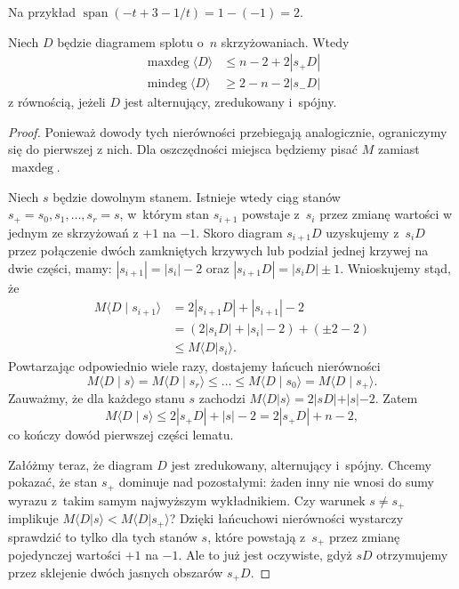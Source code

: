 Na przykład $\operatorname{span} (-t+3-1/t) = 1 - (-1) = 2$.

 \begin{lemma}
    \label{lem:pretait_lemma_2}
    Niech $D$ będzie diagramem splotu o~$n$ skrzyżowaniach.
    Wtedy
    \begin{align}
        \operatorname{maxdeg} \langle D \rangle & \le n - 2 + 2|s_+D| \\
        \operatorname{mindeg} \langle D \rangle & \ge 2 - n - 2|s_-D|
    \end{align}
    z równością, jeżeli $D$ jest alternujący, zredukowany i~spójny.
\end{lemma}

\begin{proof}
    Ponieważ dowody tych nierówności przebiegają analogicznie, ograniczymy się do pierwszej z nich.
    Dla oszczędności miejsca będziemy pisać $M$ zamiast $\operatorname{maxdeg}$.

    Niech $s$ będzie dowolnym stanem.
    Istnieje wtedy ciąg stanów $s_+ = s_0, s_1, \ldots, s_r = s$, w~którym stan $s_{i+1}$ powstaje z~$s_i$ przez zmianę wartości w jednym ze skrzyżowań z $+1$ na $-1$.
    Skoro diagram $s_{i+1}D$ uzyskujemy z~$s_{i}D$ przez połączenie dwóch zamkniętych krzywych lub podział jednej krzywej na dwie części, mamy: $|s_{i+1}| = |s_i| - 2$ oraz $|s_{i+1}D| = |s_iD| \pm 1$.
    Wnioskujemy stąd, że
    \begin{align}
        M \langle D \mid s_{i+1} \rangle
        & = 2|s_{i+1}D| + |s_{i+1}|-2 \\
        & = (2|s_iD| + |s_i| -2 ) + (\pm 2-2) \\
        & \le M \langle D|s_i\rangle.
    \end{align}
    Powtarzając odpowiednio wiele razy, dostajemy łańcuch nierówności
    \begin{equation}
        M \langle D \mid s \rangle
        =
        M \langle D \mid s_r \rangle
        \le \ldots \le
        M \langle D \mid s_0 \rangle
        =
        M \langle D \mid s_+ \rangle.
    \end{equation}
    Zauważmy, że dla każdego stanu $s$ zachodzi $M \langle D|s \rangle = 2|sD| + |s| - 2$.
    Zatem
    \begin{equation}
        M \langle D \mid s \rangle \le 2 |s_+D| + |s| - 2 = 2|s_+D| + n - 2,
    \end{equation}
    co kończy dowód pierwszej części lematu.

    Załóżmy teraz, że diagram $D$ jest zredukowany, alternujący i~spójny.
    Chcemy pokazać, że stan $s_+$ dominuje nad pozostałymi: żaden inny nie wnosi do sumy wyrazu z~takim samym najwyższym wykładnikiem.
    Czy warunek $s \neq s_+$ implikuje $M\langle D|s\rangle < M\langle D| s_+\rangle$?
    Dzięki łańcuchowi nierówności wystarczy sprawdzić to tylko dla tych stanów $s$, które powstają z~$s_+$ przez zmianę pojedynczej wartości $+1$ na $-1$.
    Ale to już jest oczywiste, gdyż $sD$ otrzymujemy przez sklejenie dwóch jasnych obszarów $s_+ D$.
\end{proof}

